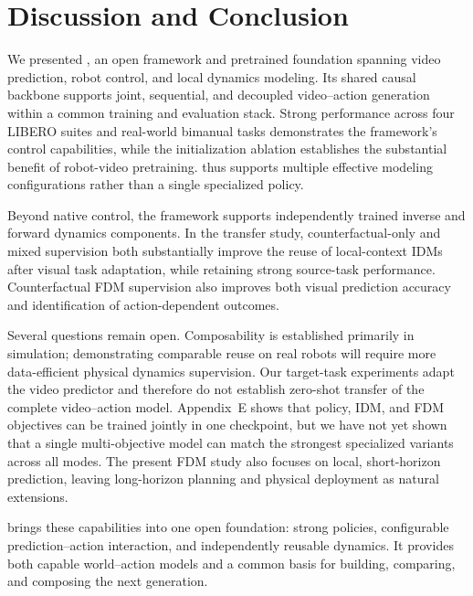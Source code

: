 \section{Discussion and Conclusion}
\label{sec:discussion}

We presented \ours, an open framework and pretrained foundation spanning
video prediction, robot control, and local dynamics modeling. Its shared
causal backbone supports joint, sequential, and decoupled video--action
generation within a common training and evaluation stack. Strong performance
across four LIBERO suites and real-world bimanual tasks demonstrates the
framework's control capabilities, while the initialization ablation
establishes the substantial benefit of robot-video pretraining. \ours
thus supports multiple effective modeling configurations rather than a
single specialized policy.

Beyond native control, the framework supports independently trained
inverse and forward dynamics components. In the transfer study,
counterfactual-only and mixed supervision both substantially improve the
reuse of local-context IDMs after visual task adaptation, while retaining
strong source-task performance. Counterfactual FDM supervision also improves both visual prediction accuracy and
identification of action-dependent outcomes.

Several questions remain open. Composability is established primarily in
simulation; demonstrating comparable reuse on real robots will require more
data-efficient physical dynamics supervision. Our target-task experiments
adapt the video predictor and therefore do not establish zero-shot transfer of
the complete video--action model. Appendix~E shows that policy, IDM, and FDM
objectives can be trained jointly in one checkpoint, but we have not yet shown
that a single multi-objective model can match the strongest specialized
\ours variants across all modes. The present FDM study also focuses on local,
short-horizon prediction, leaving long-horizon planning and physical deployment
as natural extensions.


\ours brings these capabilities into one open foundation: strong
policies, configurable prediction--action interaction, and independently
reusable dynamics. It provides both capable world--action models and a
common basis for building, comparing, and composing the next generation.


\FloatBarrier